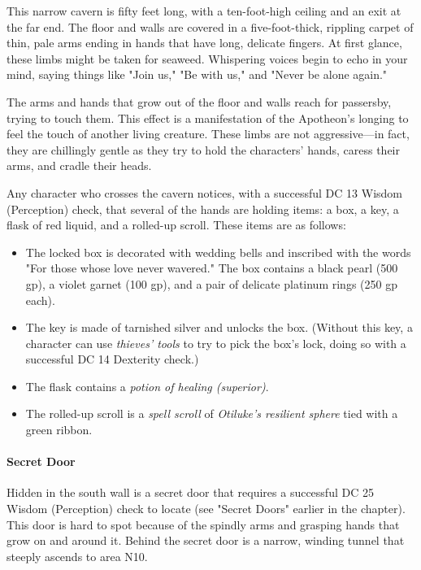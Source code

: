 \documentclass[letterpaper, 11pt, bg=full, twocolumn]{dndbook}
\begin{document}
\begin{DndReadAloud}
This narrow cavern is fifty feet long, with a ten-foot-high ceiling and an exit at the far end. The floor and walls are covered in a five-foot-thick, rippling carpet of thin, pale arms ending in hands that have long, delicate fingers. At first glance, these limbs might be taken for seaweed. Whispering voices begin to echo in your mind, saying things like "Join us," "Be with us," and "Never be alone again."
\end{DndReadAloud}

The arms and hands that grow out of the floor and walls reach for passersby, trying to touch them. This effect is a manifestation of the Apotheon's longing to feel the touch of another living creature. These limbs are not aggressive---in fact, they are chillingly gentle as they try to hold the characters' hands, caress their arms, and cradle their heads.

Any character who crosses the cavern notices, with a successful DC 13 Wisdom (Perception) check, that several of the hands are holding items: a box, a key, a flask of red liquid, and a rolled-up scroll. These items are as follows:

\begin{itemize}
\item The locked box is decorated with wedding bells and inscribed with the words "For those whose love never wavered." The box contains a black pearl (500 gp), a violet garnet (100 gp), and a pair of delicate platinum rings (250 gp each).
\item The key is made of tarnished silver and unlocks the box. (Without this key, a character can use \textit{thieves' tools} to try to pick the box's lock, doing so with a successful DC 14 Dexterity check.)
\item The flask contains a \textit{potion of healing (superior)}.
\item The rolled-up scroll is a \textit{spell scroll} of \textit{Otiluke's resilient sphere} tied with a green ribbon.
\end{itemize}

\paragraph{Secret Door}

Hidden in the south wall is a secret door that requires a successful DC 25 Wisdom (Perception) check to locate (see "Secret Doors" earlier in the chapter). This door is hard to spot because of the spindly arms and grasping hands that grow on and around it. Behind the secret door is a narrow, winding tunnel that steeply ascends to area N10.
\end{document}
